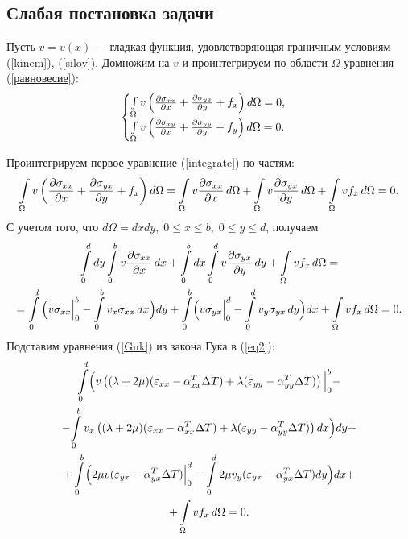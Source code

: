 \documentclass[12pt, a4paper]{article}
\begin{document}
	\subsection{Слабая постановка задачи}
	Пусть $v=v(x)$ --- гладкая функция, удовлетворяющая граничным условиям (\ref{kinem}), (\ref{silov}). Домножим на $v$ и проинтегрируем по области $\Omega$ уравнения (\ref{равновесие}):
	\begin{equation}
\begin{cases}
	\int\limits_{\Omega}v\left(	\frac{\partial\sigma_{xx}}{\partial x}+\frac{\partial\sigma_{yx}}{\partial y}+f_x\right)d\Omega=0,\\
	\int\limits_{\Omega}v\left(	\frac{\partial\sigma_{xy}}{\partial x}+\frac{\partial\sigma_{yy}}{\partial y}+f_y\right)d\Omega=0.
	\label{integrate}
\end{cases}
	\end{equation}

	Проинтегрируем первое уравнение (\ref{integrate}) по частям:
\[
	\int\limits_{\Omega}v\left(\frac{\partial\sigma_{xx}}{\partial x}+\frac{\partial\sigma_{yx}}{\partial y}+f_x\right)d\Omega=\int\limits_{\Omega}v\frac{\partial\sigma_{xx}}{\partial x}\,d\Omega+\int\limits_{\Omega}v\frac{\partial\sigma_{yx}}{\partial y}\,d\Omega+\int\limits_{\Omega}v f_{x}\,d\Omega=0.
\]
		С учетом того, что $d\Omega = dxdy,\;0\le x\le b,\;0\le y \le d$, получаем
		\begin{multline}
			\int\limits_0^d dy \int\limits_{0}^{b} v\frac{\partial\sigma_{xx}}{\partial x}\,dx+	\int\limits_0^b dx \int\limits_{0}^{d} v\frac{\partial\sigma_{yx}}{\partial y}\,dy+\int\limits_{\Omega}v f_{x}\,d\Omega=\\=\int\limits_0^d \Big(\Big. v\sigma_{xx}\Big|_0^b-\int\limits_0^b v_x\sigma_{xx}\,dx\Bigl)dy
			+\int\limits_0^b \Bigl(\Big. v\sigma_{yx}\Big|_0^d-\int\limits_0^d v_y\sigma_{yx}\,dy\Bigr)dx+\int\limits_{\Omega}v f_{x}\,d\Omega=0.
			\label{eq2}
		\end{multline}
	Подставим уравнения (\ref{Guk}) из закона Гука в (\ref{eq2}):
		\begin{multline}
\int\limits_0^d \Bigl(v\left((\lambda+2\mu)(\varepsilon_{xx}-\alpha_{xx}^T\Delta T)+\lambda(\varepsilon_{yy}-\alpha_{yy}^T\Delta T)\right)\Big|_0^b-\Bigr.\\ -\Bigl.\int\limits_0^b v_x\left((\lambda+2\mu)(\varepsilon_{xx}-\alpha_{xx}^T\Delta T)+\lambda(\varepsilon_{yy}-\alpha_{yy}^T\Delta T)\right)dx\Bigr)dy+\\+\int\limits_0^b \Bigl(2\mu v(\varepsilon_{yx}-\alpha_{yx}^T\Delta T)\Big|_0^d-\int\limits_0^d 2\mu v_y(\varepsilon_{yx}-\alpha_{yx}^T\Delta T)dy\Bigr)dx+\\+\int\limits_{\Omega}v f_{x}\,d\Omega=0.
\label{eq3}
	\end{multline}
\end{document}
